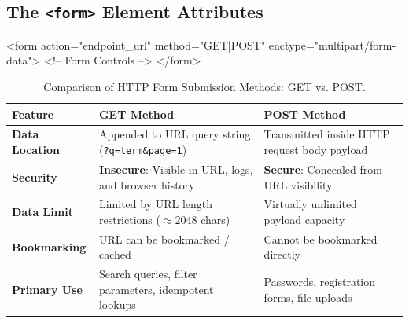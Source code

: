 \subsection{The \texttt{<form>} Element Attributes}
\begin{syntaxbox}
<form action="endpoint\_url" method="GET|POST" enctype="multipart/form-data">
    <!-- Form Controls -->
</form>
\end{syntaxbox}

\begin{table}[htbp]
\centering
\small
\renewcommand{\arraystretch}{1.3}
\begin{tabularx}{\linewidth}{l>{\raggedright\arraybackslash}X>{\raggedright\arraybackslash}X}
\toprule
\textbf{Feature} & \textbf{GET Method} & \textbf{POST Method} \\
\midrule
\textbf{Data Location} & Appended to URL query string (\texttt{?q=term\&page=1}) & Transmitted inside HTTP request body payload \\
\textbf{Security} & \textbf{Insecure}: Visible in URL, logs, and browser history & \textbf{Secure}: Concealed from URL visibility \\
\textbf{Data Limit} & Limited by URL length restrictions ($\approx 2048$ chars) & Virtually unlimited payload capacity \\
\textbf{Bookmarking} & URL can be bookmarked / cached & Cannot be bookmarked directly \\
\textbf{Primary Use} & Search queries, filter parameters, idempotent lookups & Passwords, registration forms, file uploads \\
\bottomrule
\end{tabularx}
\caption{Comparison of HTTP Form Submission Methods: GET vs. POST.}
\label{tab:get-vs-post}
\end{table}

